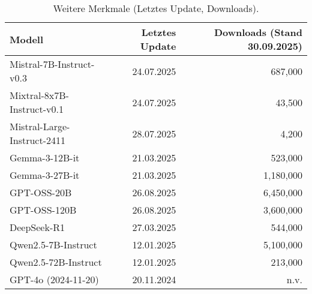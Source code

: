 \begin{table}[htbp]
    \centering
    \caption{Weitere Merkmale (Letztes Update, Downloads).}
    \label{tab:models-updates}
    \begin{tabular}{l r r}
        \toprule
        \textbf{Modell} & \textbf{Letztes Update} & \textbf{Downloads (Stand 30.09.2025)} \\
        \midrule
        Mistral-7B-Instruct-v0.3 & 24.07.2025 & 687{,}000 \cite{HF_Mistral7B_2025} \\
        Mixtral-8x7B-Instruct-v0.1 & 24.07.2025 & 43{,}500 \cite{HF_Mixtral8x7B_2025} \\
        Mistral-Large-Instruct-2411 & 28.07.2025 & 4{,}200 \cite{HF_MistralLargeInstruct_2025} \\
        \midrule
        Gemma-3-12B-it & 21.03.2025 & 523{,}000 \cite{HF_Gemma3_12B_2025} \\
        Gemma-3-27B-it & 21.03.2025 & 1{,}180{,}000 \cite{HF_Gemma3_27B_2025} \\
        \midrule
        GPT-OSS-20B & 26.08.2025 & 6{,}450{,}000 \cite{OpenAI_GPTOSS_ModelCard_2025} \\
        GPT-OSS-120B & 26.08.2025 & 3{,}600{,}000 \cite{OpenAI_GPTOSS_ModelCard_2025} \\
        \midrule
        DeepSeek-R1 & 27.03.2025 & 544{,}000 \cite{HF_DeepSeekR1_2025} \\
        \midrule
        Qwen2.5-7B-Instruct & 12.01.2025 & 5{,}100{,}000 \cite{HF_Qwen7B_2025} \\
        Qwen2.5-72B-Instruct & 12.01.2025 & 213{,}000 \cite{HF_Qwen72B_2025} \\
        \midrule
        GPT-4o (2024-11-20) & 20.11.2024 & n.v. \cite{openai-hello-gpt-4o} \\
        \bottomrule
    \end{tabular}
\end{table}